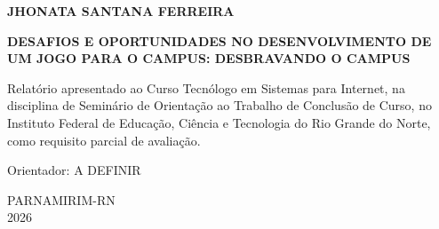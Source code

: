\documentclass[12pt, a4paper]{article}
\begin{document}
\setcounter{page}{1}         %
\onehalfspacing              %
\setlength{\parindent}{1.25cm} %


\newcommand{\assinatura}[1]{%
    \vspace{1.3cm}
    \begin{center}
        \rule{0.85\textwidth}{0.4pt}\\[-2pt]
        {\normalsize #1}\\[-2pt]
        {\footnotesize Instituto Federal de Educação, Ciência e Tecnologia do Rio Grande do Norte}
    \end{center}
}

\begin{titlepage}
    \begin{center}
        {\normalsize\bfseries JHONATA SANTANA FERREIRA}

        \vfill

        {\normalsize\bfseries DESAFIOS E OPORTUNIDADES NO DESENVOLVIMENTO DE UM JOGO PARA O CAMPUS: DESBRAVANDO O CAMPUS}
    \end{center}

    \vfill

    \begin{flushright}
        \begin{minipage}{0.5\textwidth}
            \normalsize
            \setlength{\parindent}{0pt}
            Relatório apresentado ao Curso Tecnólogo em Sistemas para Internet, na disciplina de Seminário de Orientação ao Trabalho de Conclusão de Curso, no Instituto Federal de Educação, Ciência e Tecnologia do Rio Grande do Norte, como requisito parcial de avaliação.

            \vspace{0.5cm}
            Orientador: A DEFINIR
        \end{minipage}
    \end{flushright}

    \vfill

    \begin{center}
        {\normalsize PARNAMIRIM-RN}\\[0.3cm]
        {\normalsize 2026}
    \end{center}
\end{titlepage}
\end{document}
